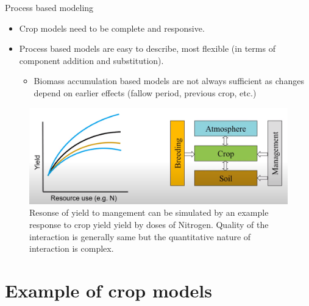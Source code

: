 \documentclass[11pt,dvipsnames,ignorenonframetext,aspectratio=169]{beamer}
\providecommand{\tightlist}{%
  \setlength{\itemsep}{0pt}\setlength{\parskip}{0pt}}
\begin{document}
\begin{frame}{Process based modeling}
\protect\hypertarget{process-based-modeling}{}
\begin{itemize}
\tightlist
\item
  Crop models need to be \alert{complete} and \alert{responsive}.
\item
  Process based models are easy to describe, most flexible (in terms of
  component addition and substitution).

  \begin{itemize}
  \tightlist
  \item
    Biomass accumulation based models are not always sufficient as
    changes depend on earlier effects (fallow period, previous crop,
    etc.)
  \end{itemize}
\end{itemize}

\begin{figure}
\includegraphics[width=0.75\linewidth]{../images/complex_interaction_factors} \caption{Resonse of yield to mangement can be simulated by an example response to crop yield yield by doses of Nitrogen. Quality of the interaction is generally same but the quantitative nature of interaction is complex.}\label{fig:process-based-models}
\end{figure}
\end{frame}

\hypertarget{example-of-crop-models}{%
\section{Example of crop models}\label{example-of-crop-models}}
\end{document}
